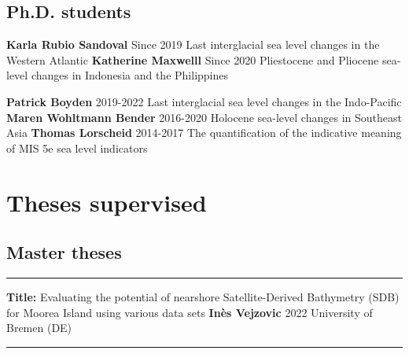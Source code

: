\documentclass[%
               doublesided,
               paper=a4,
               fontsize=10pt
              ]{my-resume}
\begin{document}
{    \subsection{Ph.D. students}
      \publication
	{} %
	{\textbf{Karla Rubio Sandoval}} %
	{Since 2019} %
	{Last interglacial sea level changes in the Western Atlantic} %
	{} %
	 \publication
	{} %
	{\textbf{Katherine Maxwelll}} %
	{Since 2020} %
	{Pliestocene and Pliocene sea-level changes in Indonesia and the Philippines} %
	{} %

        \publication
	{} %
        {\textbf{Patrick Boyden}} %
	{2019-2022} %
	{Last interglacial sea level changes in the Indo-Pacific} %
	{} %
        \publication
	{} %
        {\textbf{Maren Wohltmann Bender}} %
	{2016-2020} %
	{Holocene sea-level changes in Southeast Asia} %
	{} %
         \publication
	{} %
        {\textbf{Thomas Lorscheid}} %
	{2014-2017} %
	{The quantification of the indicative meaning of MIS 5e sea level indicators} %
	{} %
	
	
}       
\makebody
\clearpage

\pagestyle{empty}
    \section[\faCompass]{Theses supervised}
\subsection{Master theses}

\setlength{\pubdatelength}{0.25 \linewidth}
\smallskip
\hrule
\smallskip

    \publication
	{\textbf{Title:} Evaluating the potential of nearshore Satellite-Derived Bathymetry (SDB) for Moorea Island using various data sets} %
	{\textbf{Inès Vejzovic}} %
	{2022} %
	{University of Bremen (DE)} %
	{} %

\smallskip
\hrule
\smallskip
    
\end{document}
